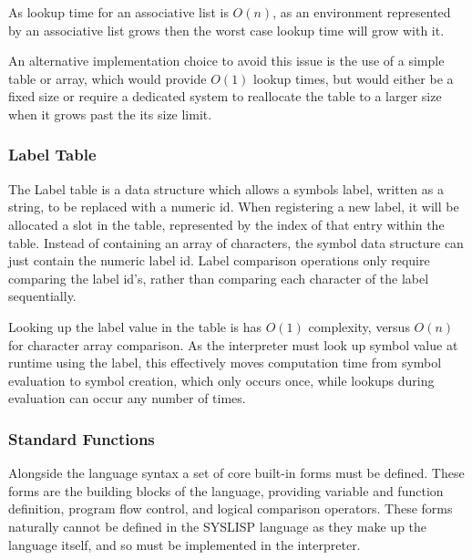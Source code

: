 \documentclass[10pt]{report}
\begin{document}
As lookup time for an associative list is $O(n)$, as an environment represented by an associative list grows then the worst case lookup time will grow with it.

An alternative implementation choice to avoid this issue is the use of a simple table or array, which would provide $O(1)$ lookup times, but would either be a fixed size or require a dedicated system to reallocate the table to a larger size when it grows past the its size limit.

\subsubsection{Label Table}
The Label table is a data structure which allows a symbols label, written as a string, to be replaced with a numeric id. When registering a new label, it will be allocated a slot in the table, represented by the index of that entry within the table. Instead of containing an array of characters, the symbol data structure can just contain the numeric label id. Label comparison operations only require comparing the label id's, rather than comparing each character of the label sequentially.

Looking up the label value in the table is has $O(1)$ complexity, versus $O(n)$ for character array comparison. As the interpreter must look up symbol value at runtime using the label, this effectively moves computation time from symbol evaluation to symbol creation, which only occurs once, while lookups during evaluation can occur any number of times.

\subsubsection{Standard Functions}
Alongside the language syntax a set of core built-in forms must be defined. These forms are the building blocks of the language, providing variable and function definition, program flow control, and logical comparison operators. These forms naturally cannot be defined in the SYSLISP language as they make up the language itself, and so must be implemented in the interpreter.
\end{document}
